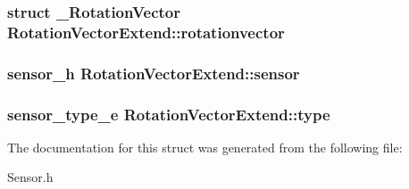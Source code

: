 \subsubsection[{rotationvector}]{\setlength{\rightskip}{0pt plus 5cm}struct {\bf \-\_\-\-Rotation\-Vector} Rotation\-Vector\-Extend\-::rotationvector}\label{structRotationVectorExtend_a3a0a423d644a254a7a1ab560ac388d10}
\subsubsection[{sensor}]{\setlength{\rightskip}{0pt plus 5cm}sensor\-\_\-h Rotation\-Vector\-Extend\-::sensor}\label{structRotationVectorExtend_a32a8fa9fca739237339c29c6ac97a472}
\subsubsection[{type}]{\setlength{\rightskip}{0pt plus 5cm}sensor\-\_\-type\-\_\-e Rotation\-Vector\-Extend\-::type}\label{structRotationVectorExtend_a40c67e273cd4123c4f79b642334cbb96}


The documentation for this struct was generated from the following file\-:\begin{DoxyCompactItemize}
\item 
Sensor.\-h\end{DoxyCompactItemize}
